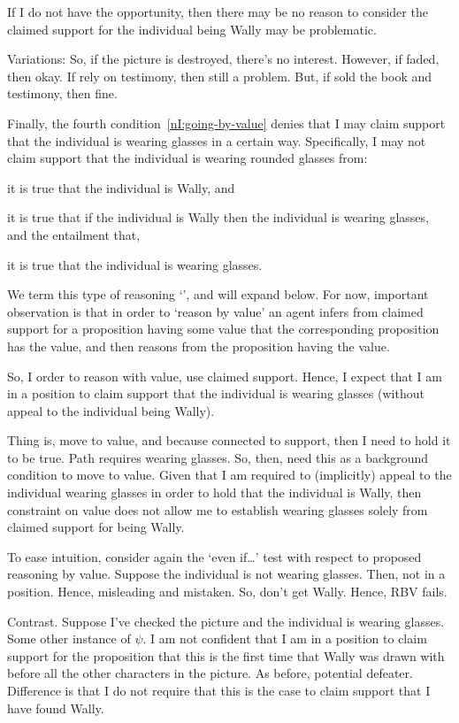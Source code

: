 \begin{note}[Illustration]
{    If I do not have the opportunity, then there may be no reason to consider the claimed support for the individual being Wally may be problematic.

    Variations:
    So, if the picture is destroyed, there's no interest.
    However, if faded, then okay.
    If rely on testimony, then still a problem.
    But, if sold the book and testimony, then fine.
  }

  Finally, the fourth condition~\ref{nI:going-by-value} denies that I may claim support that the individual is wearing glasses in a certain way.
  Specifically, I may not claim support that the individual is wearing rounded glasses from:
  \begin{enumerate*}
  \item it is true that the individual is Wally, and
  \item it is true that if the individual is Wally then the individual is wearing glasses, and the entailment that,
  \item it is true that the individual is wearing glasses.
  \end{enumerate*}
  We term this type of reasoning `\RBV{-}', and will expand below.
  For now, important observation is that in order to `reason by value' an agent infers from claimed support for a proposition having some value that the corresponding proposition has the value, and then reasons from the proposition having the value.

  So, I order to reason with value, use claimed support.
  Hence, I expect that I am in a position to claim support that the individual is wearing glasses (without appeal to the individual being Wally).

  Thing is, move to value, and because connected to support, then I need to hold it to be true.
  Path requires wearing glasses.
  So, then, need this as a background condition to move to value.
  Given that I am required to (implicitly) appeal to the individual wearing glasses in order to hold that the individual is Wally, then constraint on value does not allow me to establish wearing glasses solely from claimed support for being Wally.

  To ease intuition, consider again the `even if\dots' test with respect to proposed reasoning by value.
  Suppose the individual is not wearing glasses.
  Then, not in a position.
  Hence, misleading and mistaken.
  So, don't get Wally.
  Hence, RBV fails.

  Contrast.
  Suppose I've checked the picture and the individual is wearing glasses.
  Some other instance of \(\psi\).
  I am not confident that I am in a position to claim support for the proposition that this is the first time that Wally was drawn with before all the other characters in the picture.
  As before, potential defeater.
  Difference is that I do not require that this is the case to claim support that I have found Wally.
\end{note}

